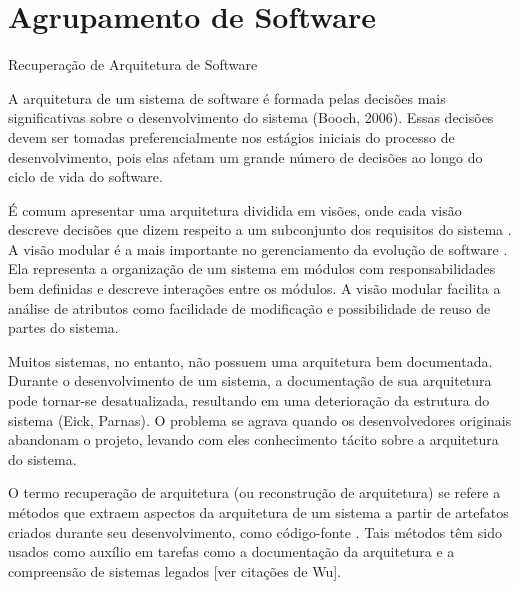 %
% 

\chapter{Agrupamento de Software}


\begin{section}{Recuperação de Arquitetura de Software}

A arquitetura de um sistema de software é formada pelas decisões mais significativas sobre o desenvolvimento do sistema (Booch, 2006). Essas decisões devem ser tomadas preferencialmente nos estágios iniciais do processo de desenvolvimento, pois elas afetam um grande número de decisões ao longo do ciclo de vida do software.

É comum apresentar uma arquitetura dividida em visões, onde cada visão descreve decisões que dizem respeito a um subconjunto dos requisitos do sistema \cite{Clements2002}. A visão modular é a mais importante no gerenciamento da evolução de software \cite{Parnas1972}. Ela representa a organização de um sistema em módulos com responsabilidades bem definidas e descreve interações entre os módulos. A visão modular facilita a análise de atributos como facilidade de modificação e possibilidade de reuso de partes do sistema.

Muitos sistemas, no entanto, não possuem uma arquitetura bem documentada. Durante o desenvolvimento de um sistema, a documentação de sua arquitetura pode tornar-se desatualizada, resultando em uma deterioração da estrutura do sistema (Eick, Parnas). O problema se agrava quando os desenvolvedores originais abandonam o projeto, levando com eles conhecimento tácito sobre a arquitetura do sistema.

O termo recuperação de arquitetura (ou reconstrução de arquitetura) se refere a métodos que extraem aspectos da arquitetura de um sistema a partir de artefatos criados durante seu desenvolvimento, como código-fonte \cite{Pollet2007}. Tais métodos têm sido usados como auxílio em tarefas como a documentação da arquitetura e a compreensão de sistemas legados [ver citações de Wu].


\end{section}
